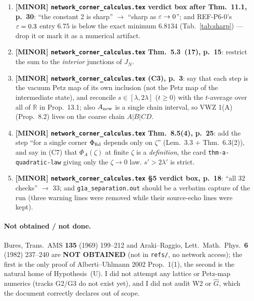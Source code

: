 \documentclass[11pt]{article}
\newcommand{\doc}{\texttt{network\_corner\_calculus.tex}}
\theoremstyle{definition}\newtheorem{example}[theorem]{Example}
\begin{document}
\begin{enumerate}[leftmargin=2.2em]
 is Alberti--Uhlmann 2002 \emph{Corollary 2(5), p.~8}, not Theorem 2(1) (which is the
 product form, p.~6); and the included screenshot is p.~11, the \emph{proof} of
 Corollary 2(5).
\item \textbf{[MINOR] \doc{} verdict box after Thm.~11.1, p.~30}: ``the constant 2 is
 sharp'' $\to$ ``sharp as $\varepsilon\to0$''; and REF-P6-0's $\varepsilon=0.3$ entry $6.75$ is below
 the exact minimum $6.8134$ (Tab.~\ref{tab:sharp}) --- drop it or mark it as a numerical
 artifact.
\item \textbf{[MINOR] \doc{} Thm.~5.3~(17), p.~15}: restrict the sum to the \emph{interior}
 junctions of $J_N$.
\item \textbf{[MINOR] \doc{} (C3), p.~3}: say that each step is the vacuum Petz map of its
 own inclusion (not the Petz map of the intermediate state), and reconcile
 $s\in[\lambda,2\lambda]$ ($t\ge0$) with the $t$-average over all of $\mathbb R$ in
 Prop.~13.1; also $A_{\rm new}$ is a single chain interval, so VWZ 1(A) (Prop.~8.2) lives
 on the coarse chain $A|B|CD$.
\item \textbf{[MINOR] \doc{} Thm.~8.5(4), p.~25}: add the step ``for a single corner
 $\Phi_{\rm fid}$ depends only on $\zeta$'' (Lem.~3.3 $+$ Thm.~6.3(2)), and say in (C7)
 that $\Phi_A(\zeta)$ at finite $\zeta$ is a \emph{definition}, the card
 \texttt{thm-a-quadratic-law} giving only the $\zeta\to0$ law.  $s'>2\lambda'$ is strict.
\item \textbf{[MINOR] \doc{} \S5 verdict box, p.~18}: ``all $32$ checks'' $\to$ $33$; and
 \texttt{g1a\_separation.out} should be a verbatim capture of the run (three warning lines
 were removed while their source-echo lines were kept).
\end{enumerate}

\paragraph{Not obtained / not done.}
Bures, Trans.\ AMS \textbf{135} (1969) 199--212 and Araki--Raggio, Lett.\ Math.\ Phys.\
\textbf{6} (1982) 237--240 are \textbf{NOT OBTAINED} (not in \texttt{refs/}, no network
access); the first is the only proof of Alberti--Uhlmann 2002 Prop.~1(1), the second is
the natural home of Hypothesis~(U).  I did not attempt any lattice or Petz-map numerics
(tracks G2/G3 do not exist yet), and I did not audit W2 or $\hat G$, which the document
correctly declares out of scope.
\end{document}
